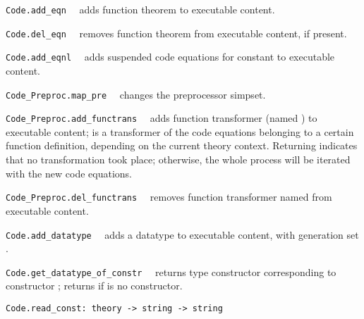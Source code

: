 \begin{isabellebody}
\begin{isamarkuptext}
  \begin{description}

  \item \verb|Code.add_eqn|~~ adds function
     theorem  to executable content.

  \item \verb|Code.del_eqn|~~ removes function
     theorem  from executable content, if present.

  \item \verb|Code.add_eqnl|~~ adds
     suspended code equations  for constant
      to executable content.

  \item \verb|Code_Preproc.map_pre|~~ changes
     the preprocessor simpset.

  \item \verb|Code_Preproc.add_functrans|~~ adds
     function transformer  (named ) to executable content;
      is a transformer of the code equations belonging
     to a certain function definition, depending on the
     current theory context.  Returning  indicates that no
     transformation took place;  otherwise, the whole process will be iterated
     with the new code equations.

  \item \verb|Code_Preproc.del_functrans|~~ removes
     function transformer named  from executable content.

  \item \verb|Code.add_datatype|~~ adds
     a datatype to executable content, with generation
     set .

  \item \verb|Code.get_datatype_of_constr|~~
     returns type constructor corresponding to
     constructor ; returns 
     if  is no constructor.

  \end{description}%
\end{isamarkuptext}%
\isamarkuptrue%
%
\endisatagmlref
{\isafoldmlref}%
%
\isadelimmlref
%
\endisadelimmlref
%
\isamarkuptrue%
%
\isadelimmlref
%
\endisadelimmlref
%
\isatagmlref
%
\begin{isamarkuptext}%
\begin{mldecls}
  \verb|Code.read_const: theory -> string -> string|
  \end{mldecls}


\end{isamarkuptext}
\end{isabellebody}
